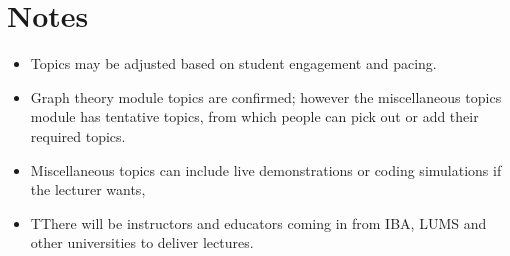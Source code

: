 \documentclass[12pt]{article}
\begin{document}
\section{Notes}

\begin{itemize}
    \item Topics may be adjusted based on student engagement and pacing.
    \item Graph theory module topics are confirmed; however the miscellaneous topics module has tentative topics, from which people can pick out or add their required topics. 
    \item Miscellaneous topics can include live demonstrations or coding simulations if the lecturer wants,
    \item TThere will be instructors and educators coming in from IBA, LUMS and other universities to deliver lectures. 
\end{itemize}
\end{document}
